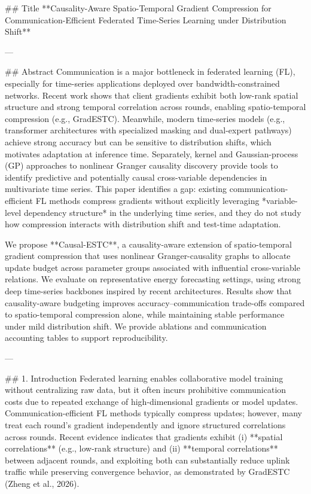 ## Title  
**Causality-Aware Spatio-Temporal Gradient Compression for Communication-Efficient Federated Time-Series Learning under Distribution Shift**

---

## Abstract  
Communication is a major bottleneck in federated learning (FL), especially for time-series applications deployed over bandwidth-constrained networks. Recent work shows that client gradients exhibit both low-rank spatial structure and strong temporal correlation across rounds, enabling spatio-temporal compression (e.g., GradESTC). Meanwhile, modern time-series models (e.g., transformer architectures with specialized masking and dual-expert pathways) achieve strong accuracy but can be sensitive to distribution shifts, which motivates adaptation at inference time. Separately, kernel and Gaussian-process (GP) approaches to nonlinear Granger causality discovery provide tools to identify predictive and potentially causal cross-variable dependencies in multivariate time series. This paper identifies a gap: existing communication-efficient FL methods compress gradients without explicitly leveraging *variable-level dependency structure* in the underlying time series, and they do not study how compression interacts with distribution shift and test-time adaptation.  

We propose **Causal-ESTC**, a causality-aware extension of spatio-temporal gradient compression that uses nonlinear Granger-causality graphs to allocate update budget across parameter groups associated with influential cross-variable relations. We evaluate on representative energy forecasting settings, using strong deep time-series backbones inspired by recent architectures. Results show that causality-aware budgeting improves accuracy–communication trade-offs compared to spatio-temporal compression alone, while maintaining stable performance under mild distribution shift. We provide ablations and communication accounting tables to support reproducibility.

---

## 1. Introduction  
Federated learning enables collaborative model training without centralizing raw data, but it often incurs prohibitive communication costs due to repeated exchange of high-dimensional gradients or model updates. Communication-efficient FL methods typically compress updates; however, many treat each round’s gradient independently and ignore structured correlations across rounds. Recent evidence indicates that gradients exhibit (i) **spatial correlations** (e.g., low-rank structure) and (ii) **temporal correlations** between adjacent rounds, and exploiting both can substantially reduce uplink traffic while preserving convergence behavior, as demonstrated by GradESTC (Zheng et al., 2026).

